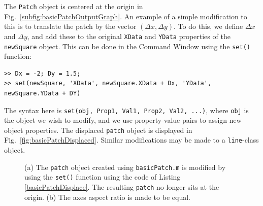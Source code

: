 The \texttt{Patch} object is centered at the origin in Fig.\ \ref{subfig:basicPatchOutputGraph}. An example of a simple modification to this is to translate the patch by the vector $(\Delta x, \Delta y)$. To do this, we define $\Delta x$ and $\Delta y$, and add these to the original \texttt{XData} and \texttt{YData} properties of the \texttt{newSquare} object. This can be done in the Command Window using the \texttt{set()} function:
\begin{lstlisting}[style=Matlab-editor,label=basicPatchDisplace,caption={A Command Window modification to the \texttt{patch} defined in Listing \ref{basicPatch}. Line 1 is used to specify the $x$- and $y$-components of the displacement. The displacement is then applied to the original \texttt{XData} and \texttt{YData} properties, and the result of the addition is the value component of a property-value pair in the \texttt{set()} function.}]
>> Dx = -2; Dy = 1.5;
>> set(newSquare, 'XData', newSquare.XData + Dx, 'YData', newSquare.YData + DY)
\end{lstlisting}
The syntax here is \verb!set(obj, Prop1, Val1, Prop2, Val2, ...)!, where \texttt{obj} is the object we wish to modify, and we use property-value pairs to assign new object properties. The displaced \texttt{patch} object is displayed in Fig.\ \ref{fig:basicPatchDisplaced}. Similar modifications may be made to a \texttt{line}-class object.

\begin{figure}[htbp] %
   \centering
      \caption{(a) The \texttt{patch} object created using \texttt{basicPatch.m} is modified by using the \texttt{set()} function using the code of Listing \ref{basicPatchDisplace}. The resulting \texttt{patch} no longer sits at the origin. (b) The axes aspect ratio is made to be equal.}

\end{figure}

